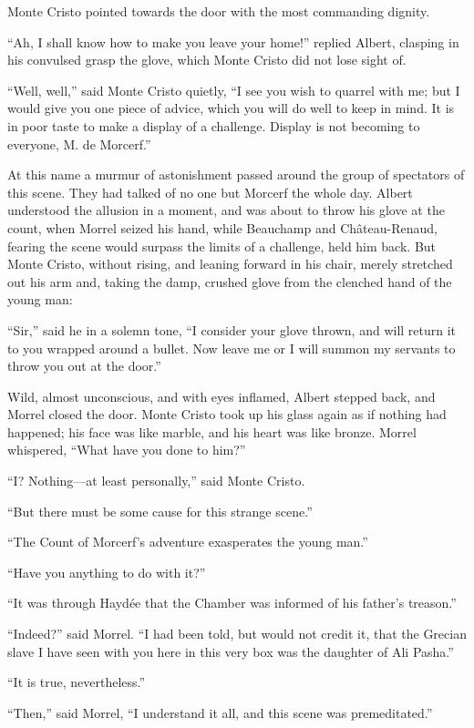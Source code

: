 Monte Cristo pointed towards the door with the most commanding dignity.

“Ah, I shall know how to make you leave your home!” replied Albert,
clasping in his convulsed grasp the glove, which Monte Cristo did not
lose sight of.

“Well, well,” said Monte Cristo quietly, “I see you wish to quarrel
with me; but I would give you one piece of advice, which you will do
well to keep in mind. It is in poor taste to make a display of a
challenge. Display is not becoming to everyone, M. de Morcerf.”

At this name a murmur of astonishment passed around the group of
spectators of this scene. They had talked of no one but Morcerf the
whole day. Albert understood the allusion in a moment, and was about to
throw his glove at the count, when Morrel seized his hand, while
Beauchamp and Château-Renaud, fearing the scene would surpass the
limits of a challenge, held him back. But Monte Cristo, without rising,
and leaning forward in his chair, merely stretched out his arm and,
taking the damp, crushed glove from the clenched hand of the young man:

“Sir,” said he in a solemn tone, “I consider your glove thrown, and
will return it to you wrapped around a bullet. Now leave me or I will
summon my servants to throw you out at the door.”

Wild, almost unconscious, and with eyes inflamed, Albert stepped back,
and Morrel closed the door. Monte Cristo took up his glass again as if
nothing had happened; his face was like marble, and his heart was like
bronze. Morrel whispered, “What have you done to him?”

“I? Nothing—at least personally,” said Monte Cristo.

“But there must be some cause for this strange scene.”

“The Count of Morcerf’s adventure exasperates the young man.”

“Have you anything to do with it?”

“It was through Haydée that the Chamber was informed of his father’s
treason.”

“Indeed?” said Morrel. “I had been told, but would not credit it, that
the Grecian slave I have seen with you here in this very box was the
daughter of Ali Pasha.”

“It is true, nevertheless.”

“Then,” said Morrel, “I understand it all, and this scene was
premeditated.”

